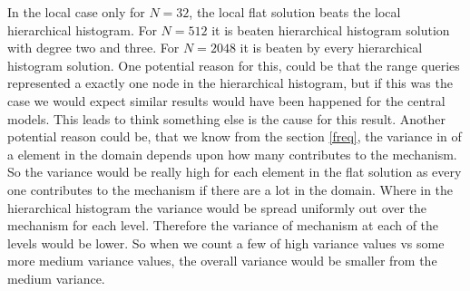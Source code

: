 \documentclass[11pt]{article}
\theoremstyle{definition}
\begin{document}
In the local case only for $N=32$, the local flat solution beats the local hierarchical histogram. For $N=512$ it is beaten hierarchical histogram solution with degree two and three. For $N=2048$ it is beaten by every hierarchical histogram solution. One potential reason for this, could be that the range queries represented a exactly one node in the hierarchical histogram, but if this was the case we would expect similar results would have been happened for the central models. This leads to think something else is the cause for this result. Another potential reason could be, that we know from the section \ref{freq}, the variance in of a element in the domain depends upon how many contributes to the mechanism. So the variance would be really high for each element in the flat solution as every one contributes to the mechanism if there are a lot in the domain. Where in the hierarchical histogram the variance would be spread uniformly out over the mechanism for each level. Therefore the variance of mechanism at each of the levels would be lower. So when we count a few of high variance values vs some more medium variance values, the overall variance would be smaller from the medium variance.
\end{document}
